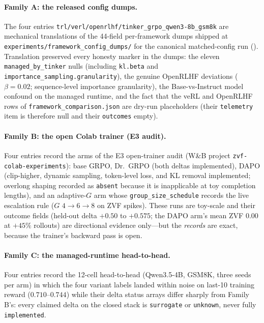 \paragraph{Family A: the released config dumps.}
The four entries \texttt{trl/verl/openrlhf/tinker_grpo_qwen3-8b_gsm8k} are
mechanical translations of the 44-field per-framework dumps shipped at
\texttt{experiments/framework_config_dumps/} for the canonical matched-config
run (). Translation preserved every honesty marker in the
dumps: the eleven \texttt{managed_by_tinker} nulls (including \texttt{kl.beta}
and \texttt{importance_sampling.granularity}), the genuine OpenRLHF deviations
($\beta{=}0.02$; sequence-level importance granularity), the Base-vs-Instruct
model confound on the managed runtime, and the fact that the veRL and OpenRLHF
rows of \texttt{framework_comparison.json} are dry-run placeholders (their
\texttt{telemetry} item is therefore null and their \texttt{outcomes} empty).

\paragraph{Family B: the open Colab trainer (E3 audit).}
Four entries record the arms of the E3 open-trainer audit (W\&B project
\texttt{zvf-colab-experiments}): base GRPO, Dr.~GRPO (both deltas
implemented), DAPO (clip-higher, dynamic sampling, token-level loss, and KL
removal implemented; overlong shaping recorded as \texttt{absent} because it
is inapplicable at toy completion lengths), and an adaptive-$G$ arm whose
\texttt{group_size_schedule} records the live escalation rule ($G$
$4{\to}6{\to}8$ on ZVF spikes). These runs are toy-scale and their outcome
fields (held-out delta $+0.50$ to $+0.575$; the DAPO arm's mean ZVF $0.00$ at
$+45\%$ rollouts) are directional evidence only---but the \emph{records} are
exact, because the trainer's backward pass is open.

\paragraph{Family C: the managed-runtime head-to-head.}
Four entries record the 12-cell head-to-head (Qwen3.5-4B, GSM8K, three seeds
per arm) in which the four variant labels landed within noise on last-10
training reward ($0.710$--$0.744$) while their delta status arrays differ
sharply from Family B's: every claimed delta on the closed stack is
\texttt{surrogate} or \texttt{unknown}, never fully \texttt{implemented}.

